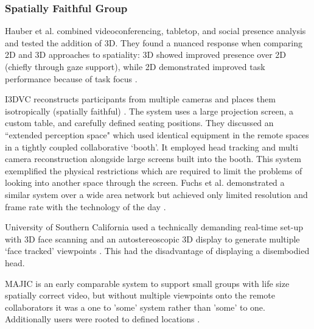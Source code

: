 \subsubsection{Spatially Faithful Group}
Hauber et al. combined videoconferencing, tabletop, and social presence analysis and tested the addition of 3D. They found a nuanced response when comparing 2D and 3D approaches to spatiality: 3D showed improved presence over 2D (chiefly through gaze support), while 2D demonstrated improved task performance because of task focus \cite{Hauber2006}.\par
I3DVC reconstructs participants from multiple cameras and places them isotropically (spatially faithful) \cite{Kauff2002, Kauff2002a}. The system uses a large projection screen, a custom table, and carefully defined seating positions. They discussed an ``extended perception space" which used identical equipment in the remote spaces in a tightly coupled collaborative `booth'. It employed head tracking and multi camera reconstruction alongside large screens built into the booth. This system exemplified the physical restrictions which are required to limit the problems of looking into another space through the screen. Fuchs et al. demonstrated a similar system over a wide area network but achieved only limited resolution and frame rate with the technology of the day \cite{Fuchs2002}. \par University of Southern California used a technically demanding real-time set-up with 3D face scanning and an autostereoscopic 3D display to generate multiple `face tracked' viewpoints \cite{Jones2009}. This had the disadvantage of displaying a disembodied head.\par                
MAJIC is an early comparable system to support small groups with life size spatially correct video, but without multiple viewpoints onto the remote collaborators it was a one to 'some' system rather than 'some' to one. Additionally users were rooted to defined locations \cite{Ichikawa1995, Okada1994}.\par
